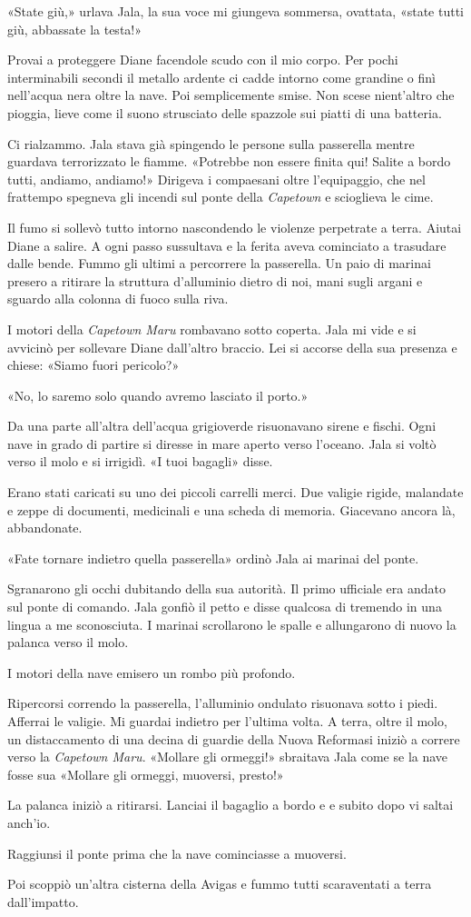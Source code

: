 «State giù,» urlava Jala, la sua voce mi giungeva sommersa, ovattata,
«state tutti giù, abbassate la testa!»

Provai a proteggere Diane facendole scudo con il mio corpo. Per pochi
interminabili secondi il metallo ardente ci cadde intorno come grandine
o finì nell'acqua nera oltre la nave. Poi semplicemente smise. Non scese
nient'altro che pioggia, lieve come il suono strusciato delle spazzole
sui piatti di una batteria.

Ci rialzammo. Jala stava già spingendo le persone sulla passerella
mentre guardava terrorizzato le fiamme. «Potrebbe non essere finita qui!
Salite a bordo tutti, andiamo, andiamo!» Dirigeva i compaesani oltre
l'equipaggio, che nel frattempo spegneva gli incendi sul ponte della
\emph{Capetown} e scioglieva le cime.

Il fumo si sollevò tutto intorno nascondendo le violenze perpetrate a
terra. Aiutai Diane a salire. A ogni passo sussultava e la ferita aveva
cominciato a trasudare dalle bende. Fummo gli ultimi a percorrere la
passerella. Un paio di marinai presero a ritirare la struttura
d'alluminio dietro di noi, mani sugli argani e sguardo alla colonna di
fuoco sulla riva.

I motori della \emph{Capetown Maru} rombavano sotto coperta. Jala mi
vide e si avvicinò per sollevare Diane dall'altro braccio. Lei si
accorse della sua presenza e chiese: «Siamo fuori pericolo?»

«No, lo saremo solo quando avremo lasciato il porto.»

Da una parte all'altra dell'acqua grigioverde risuonavano sirene e
fischi. Ogni nave in grado di partire si diresse in mare aperto verso
l'oceano. Jala si voltò verso il molo e si irrigidì. «I tuoi bagagli»
disse.

Erano stati caricati su uno dei piccoli carrelli merci. Due valigie
rigide, malandate e zeppe di documenti, medicinali e una scheda di
memoria. Giacevano ancora là, abbandonate.

«Fate tornare indietro quella passerella» ordinò Jala ai marinai del
ponte.

Sgranarono gli occhi dubitando della sua autorità. Il primo ufficiale
era andato sul ponte di comando. Jala gonfiò il petto e disse qualcosa
di tremendo in una lingua a me sconosciuta. I marinai scrollarono le
spalle e allungarono di nuovo la palanca verso il molo.

I motori della nave emisero un rombo più profondo.

Ripercorsi correndo la passerella, l'alluminio ondulato risuonava sotto
i piedi. Afferrai le valigie. Mi guardai indietro per l'ultima volta. A
terra, oltre il molo, un distaccamento di una decina di guardie della
Nuova Reformasi iniziò a correre verso la \emph{Capetown Maru}. «Mollare
gli ormeggi!» sbraitava Jala come se la nave fosse sua «Mollare gli
ormeggi, muoversi, presto!»

La palanca iniziò a ritirarsi. Lanciai il bagaglio a bordo e e subito
dopo vi saltai anch'io.

Raggiunsi il ponte prima che la nave cominciasse a muoversi.

Poi scoppiò un'altra cisterna della Avigas e fummo tutti scaraventati a
terra dall'impatto.